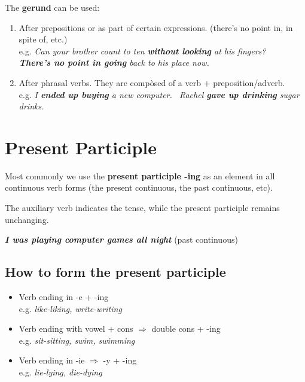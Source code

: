 \documentclass[hidelinks,10pt,a4paper]{article}
\begin{document}
The \textbf{gerund} can be used:
\begin{enumerate}[label=(\alph*)]
	\item After prepositions or as part of certain expressions. (there's no point in, in spite of, etc.)\\
		e.g. \textit{Can your brother count to ten \textbf{without looking} at his fingers? \\
					 \textbf{There's no point in going} back to his place now. }
	\item After phrasal verbs. They are compòsed of a verb + preposition/adverb. \\
		e.g. \textit{I \textbf{ended up buying} a new computer. \
		Rachel \textbf{gave up drinking} sugar drinks.}
\end{enumerate}

\section{Present Participle}
Most commonly we use the \textbf{present participle -ing} as an element in all continuous verb forms (the present continuous, the past continuous, etc).

The auxiliary verb indicates the tense, while the present participle remains unchanging.

\begin{center}
	\textit{ \textbf{I was playing computer games all night} } (past continuous)
\end{center}

\subsection{How to form the present participle}

\begin{itemize}
	\item Verb ending in -e + -ing \\
		e.g. \textit{like-liking, write-writing}
	\item Verb ending with vowel + cons $\Rightarrow$ double cons + -ing \\
		e.g. \textit{sit-sitting, swim, swimming}
	\item Verb ending in -ie $\Rightarrow$ -y + -ing \\
		e.g. \textit{lie-lying, die-dying}
\end{itemize}
\end{document}
